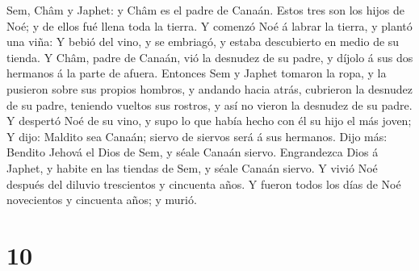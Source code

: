 Sem, Châm y Japhet: y Châm es el padre de Canaán.  Estos
tres son los hijos de Noé; y de ellos fué llena toda la tierra.
 Y comenzó Noé á labrar la tierra, y plantó una viña:
 Y bebió del vino, y se embriagó, y estaba descubierto en
medio de su tienda.  Y Châm, padre de Canaán, vió la
desnudez de su padre, y díjolo á sus dos hermanos á la parte de afuera.
 Entonces Sem y Japhet tomaron la ropa, y la pusieron sobre
sus propios hombros, y andando hacia atrás, cubrieron la desnudez de su
padre, teniendo vueltos sus rostros, y así no vieron la desnudez de su
padre.  Y despertó Noé de su vino, y supo lo que había
hecho con él su hijo el más joven;  Y dijo: Maldito sea
Canaán; siervo de siervos será á sus hermanos.  Dijo más:
Bendito Jehová el Dios de Sem, y séale Canaán siervo. 
Engrandezca Dios á Japhet, y habite en las tiendas de Sem, y séale
Canaán siervo.  Y vivió Noé después del diluvio trescientos
y cincuenta años.  Y fueron todos los días de Noé
novecientos y cincuenta años; y murió.

\hypertarget{section-9}{%
\section{10}\label{section-9}}

